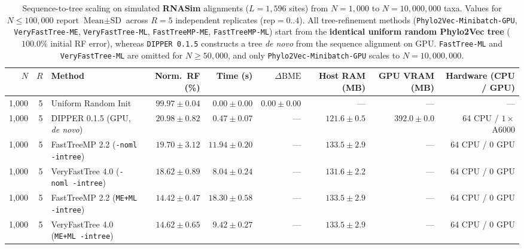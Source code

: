 
\begin{table}[tbp]
\centering
\caption{Sequence-to-tree scaling on simulated \textbf{RNASim} alignments ($L = 1{,}596$ sites) from $N = 1{,}000$ to $N = 10{,}000{,}000$ taxa. Values for $N \le 100{,}000$ report $\text{Mean} \pm \text{SD}$ across $R = 5$ independent replicates ($\text{rep} = 0..4$). All tree-refinement methods (\texttt{Phylo2Vec-Minibatch-GPU}, \texttt{VeryFastTree-ME}, \texttt{VeryFastTree-ML}, \texttt{FastTreeMP-ME}, \texttt{FastTreeMP-ML}) start from the \textbf{identical uniform random Phylo2Vec tree} ($100.0\%$ initial RF error), whereas \texttt{DIPPER 0.1.5} constructs a tree \textit{de novo} from the sequence alignment on GPU. \texttt{FastTree-ML} and \texttt{VeryFastTree-ML} are omitted for $N \ge 50{,}000$, and only \texttt{Phylo2Vec-Minibatch-GPU} scales to $N = 10{,}000{,}000$.}
\label{tab:rnasim_full_scaling}
\scriptsize
\setlength{\tabcolsep}{4.2pt}
\begin{tabular}{@{}rrlrrrrrr@{}}
\toprule
$N$ & $R$ & Method & Norm.\ RF (\%) & Time (s) & $\Delta\text{BME}$ & Host RAM (MB) & GPU VRAM (MB) & Hardware (CPU / GPU)\\
\midrule
1,000 & 5 & Uniform Random Init & $99.97 \pm 0.04$ & $0.00 \pm 0.00$ & $0.00 \pm 0.00$ & --- & --- & ---\\
1,000 & 5 & DIPPER 0.1.5 (GPU, \textit{de novo}) & $20.98 \pm 0.82$ & $0.47 \pm 0.07$ & --- & $121.6 \pm 0.5$ & $392.0 \pm 0.0$ & 64 CPU / $1\times$ A6000\\
1,000 & 5 & FastTreeMP 2.2 (\texttt{-noml -intree}) & $19.70 \pm 3.12$ & $11.94 \pm 0.20$ & --- & $133.5 \pm 2.9$ & --- & 64 CPU / 0 GPU\\
1,000 & 5 & VeryFastTree 4.0 (\texttt{-noml -intree}) & $18.62 \pm 0.89$ & $8.04 \pm 0.24$ & --- & $131.6 \pm 2.2$ & --- & 64 CPU / 0 GPU\\
1,000 & 5 & FastTreeMP 2.2 (\texttt{ME+ML -intree}) & $\mathbf{14.42 \pm 0.47}$ & $18.30 \pm 0.58$ & --- & $133.5 \pm 2.9$ & --- & 64 CPU / 0 GPU\\
1,000 & 5 & VeryFastTree 4.0 (\texttt{ME+ML -intree}) & $14.62 \pm 0.65$ & $9.42 \pm 0.27$ & --- & $133.5 \pm 2.9$ & --- & 64 CPU / 0 GPU\\

\end{tabular}
\end{table}
